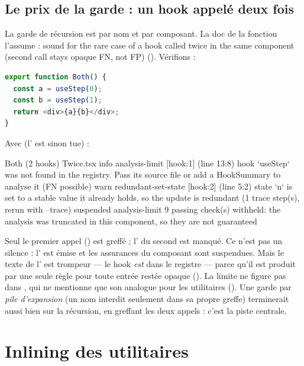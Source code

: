 \subsection{Le prix de la garde : un hook appelé deux fois}

La garde de récursion est par nom et par composant. La doc de la fonction l'assume : \og sound for the rare case of a hook called twice in the same component (second call stays opaque FN, not FP)\fg{} (). Vérifions :

\begin{lstlisting}[language=TypeScript,caption={Deux appels du même hook (\file{/tmp/ch08/step/Twice.tsx}, \code{useStep} du \cref{lst:splice-usestep})}]
export function Both() {
  const a = useStep(0);
  const b = useStep(1);
  return <div>{a}{b}</div>;
}
\end{lstlisting}
Avec  (l'\Info{} est sinon tue) :
\begin{sortie}
  Both  (2 hooks)  Twice.tsx
    info   analysis-limit  [hook:1]  (line 13:8)  hook `useStep` was not found in the registry. Pass its source file or add a HookSummary to analyse it (FN possible)
    warn   redundant-set-state  [hook:2]  (line 5:2)  state `n` is set to a stable value it already holds, so the update is redundant
       (1 trace step(s), rerun with --trace)
    suspended  analysis-limit  9 passing check(s) withheld: the analysis was truncated in this component, so they are not guaranteed
\end{sortie}

Seul le premier appel () est greffé ; l' du second est manqué. Ce n'est pas un silence : l'\Info{} est émise et les assurances du composant sont suspendues. Mais le texte de l'\Info{} est trompeur --- le hook \emph{est} dans le registre --- parce qu'il est produit par une seule règle pour toute entrée  restée opaque (). La limite ne figure pas dans , qui ne mentionne que son analogue pour les utilitaires (). Une garde par \emph{pile d'expansion} (un nom interdit seulement dans sa propre greffe) terminerait aussi bien sur la récursion, en greffant les deux appels : c'est la piste centrale.

\section{Inlining des utilitaires}
\label{sec:splice-utilitaires}

